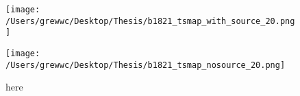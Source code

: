 \documentclass[12pt]{report}
\newcommand{\mycaption}[1]{\protect \caption{#1}}
\begin{document}
            \begin{figure}[!ht]
              \begin{center}
              \begin{minipage}{0.46\textwidth}
                \begin{center} 
                  \texttt{[image: /Users/grewwc/Desktop/Thesis/b1821\_tsmap\_with\_source\_20.png]}
                \end{center}
              \end{minipage}
              \begin{minipage}{0.45\textwidth}
                \begin{center}
                  \texttt{[image: /Users/grewwc/Desktop/Thesis/b1821\_tsmap\_nosource\_20.png]}
                \end{center}
              \end{minipage}
            \end{center}
            \caption{here}
            
              \label{fig: b1821_tsmap_comparison_20}
            \end{figure}
            \vspace{1cm}
\end{document}
